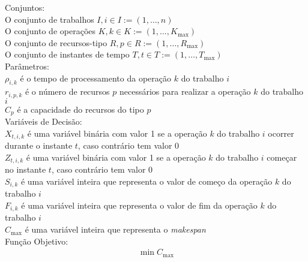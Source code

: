 Conjuntos:\\
O conjunto de trabalhos $I, i \in I := (1, \ldots, n)$ \\
O conjunto de operações $K, k \in K := (1, \ldots, K_{\max})$ \\
O conjunto de recursos-tipo $R, p \in R := (1, \ldots, R_{\max})$ \\
O conjunto de instantes de tempo $T, t \in T := (1, \ldots, T_{\max})$ \\

Parâmetros:\\
$\rho_{i,k}$ é o tempo de processamento da operação $k$ do trabalho $i$ \\
$r_{i,p,k}$ é o número de recursos $p$ necessários para realizar a operação $k$ do trabalho $i$ \\
$C_{p}$ é a capacidade do recursos do tipo $p$ \\

Variáveis de Decisão: \\
$X_{t,i,k}$ é uma variável binária com valor 1 se a operação $k$ do trabalho $i$ ocorrer durante o instante $t$, caso contrário tem valor 0 \\
$Z_{t,i,k}$ é uma variável binária com valor 1 se a operação $k$ do trabalho $i$ começar no instante $t$, caso contrário tem valor 0 \\
$S_{i,k}$ é uma variável inteira que representa o valor de começo da operação $k$ do trabalho $i$ \\
$F_{i,k}$ é uma variável inteira que representa o valor de fim da operação $k$ do trabalho $i$ \\
$C_{\max}$ é uma variável inteira que representa o \textit{makespan} \\

Função Objetivo:
\begin{align}
\min C_{\max} \label{eq:1}
\end{align}

